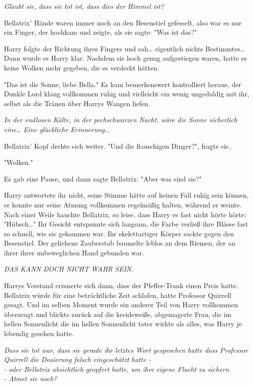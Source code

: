 {\emph{Glaubt sie, dass sie tot ist, dass dies der Himmel ist?}

Bellatrix' Hände waren immer noch an den Besenstiel gefesselt, also war es nur ein Finger, der hochkam und zeigte, als sie sagte: "Was ist das?"

Harry folgte der Richtung ihres Fingers und sah… eigentlich nichts Bestimmtes…\\ Dann wurde es Harry klar. Nachdem sie hoch genug aufgestiegen waren, hatte es keine Wolken mehr gegeben, die es verdeckt hätten.

"Das ist die Sonne, liebe Bella." Es kam bemerkenswert kontrolliert heraus, der Dunkle Lord klang vollkommen ruhig und vielleicht ein wenig ungeduldig mit ihr, selbst als die Tränen über Harrys Wangen liefen.

\emph{In der endlosen Kälte, in der pechschwarzen Nacht, wäre die Sonne sicherlich eine… Eine glückliche Erinnerung}…

Bellatrix' Kopf drehte sich weiter. "Und die flauschigen Dinger?", fragte sie.

"Wolken."

Es gab eine Pause, und dann sagte Bellatrix: "Aber was sind sie?"

Harry antwortete ihr nicht, seine Stimme hätte auf keinen Fall ruhig sein können, er konnte nur seine Atmung vollkommen regelmäßig halten, während er weinte. Nach einer Weile hauchte Bellatrix, so leise, dass Harry es fast nicht hörte hörte: "Hübsch…" Ihr Gesicht entspannte sich langsam, die Farbe verließ ihre Blässe fast so schnell, wie sie gekommen war. Ihr skelettartiger Körper sackte gegen den Besenstiel. Der geliehene Zauberstab baumelte leblos an dem Riemen, der an ihrer ihrer unbeweglichen Hand gebunden war.

\emph{DAS KANN DOCH NICHT WAHR SEIN.}

Harrys Verstand erinnerte sich dann, dass der Pfeffer-Trank einen Preis hatte. Bellatrix würde für eine beträchtliche Zeit schlafen, hatte Professor Quirrell gesagt. Und im selben Moment wurde ein anderer Teil von Harry vollkommen überzeugt und blickte zurück auf die kreideweiße, abgemagerte Frau, die im hellen Sonnenlicht die im hellen Sonnenlicht toter wirkte als alles, was Harry je lebendig gesehen hatte.

\emph{Dass sie tot war, dass sie gerade ihr letztes Wort gesprochen hatte dass Professor Quirrell die Dosierung falsch eingeschätzt hatte -}\\ \emph{- oder Bellatrix absichtlich geopfert hatte, um ihre eigene Flucht zu sichern}\\ \emph{- Atmet sie noch?}

}
